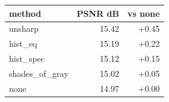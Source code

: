 \begin{tabular}{lrr}
\toprule
method & PSNR dB & vs none \\
\midrule
unsharp & 15.42 & +0.45 \\
hist\_eq & 15.19 & +0.22 \\
hist\_spec & 15.12 & +0.15 \\
shades\_of\_gray & 15.02 & +0.05 \\
none & 14.97 & +0.00 \\
\bottomrule
\end{tabular}
